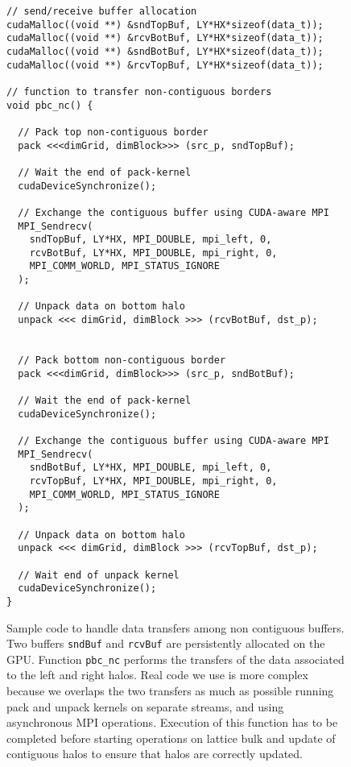 \documentclass{elsarticle}
\begin{document}
%
\begin{figure}
\centering
\begin{lstlisting}[basicstyle=\scriptsize]
// send/receive buffer allocation
cudaMalloc((void **) &sndTopBuf, LY*HX*sizeof(data_t));
cudaMalloc((void **) &rcvBotBuf, LY*HX*sizeof(data_t)); 
cudaMalloc((void **) &sndBotBuf, LY*HX*sizeof(data_t));
cudaMalloc((void **) &rcvTopBuf, LY*HX*sizeof(data_t)); 

// function to transfer non-contiguous borders
void pbc_nc() {

  // Pack top non-contiguous border
  pack <<<dimGrid, dimBlock>>> (src_p, sndTopBuf); 

  // Wait the end of pack-kernel
  cudaDeviceSynchronize();                      

  // Exchange the contiguous buffer using CUDA-aware MPI
  MPI_Sendrecv(
    sndTopBuf, LY*HX, MPI_DOUBLE, mpi_left, 0,
    rcvBotBuf, LY*HX, MPI_DOUBLE, mpi_right, 0,
    MPI_COMM_WORLD, MPI_STATUS_IGNORE
  );

  // Unpack data on bottom halo
  unpack <<< dimGrid, dimBlock >>> (rcvBotBuf, dst_p); 
  
  
  // Pack bottom non-contiguous border
  pack <<<dimGrid, dimBlock>>> (src_p, sndBotBuf); 

  // Wait the end of pack-kernel
  cudaDeviceSynchronize();                      

  // Exchange the contiguous buffer using CUDA-aware MPI
  MPI_Sendrecv(
    sndBotBuf, LY*HX, MPI_DOUBLE, mpi_left, 0,
    rcvTopBuf, LY*HX, MPI_DOUBLE, mpi_right, 0,
    MPI_COMM_WORLD, MPI_STATUS_IGNORE
  );

  // Unpack data on bottom halo
  unpack <<< dimGrid, dimBlock >>> (rcvTopBuf, dst_p); 
  
  // Wait end of unpack kernel
  cudaDeviceSynchronize();                          
}
\end{lstlisting}
\caption{\label{fig:nc-buffers}
Sample code to handle 
data transfers among non contiguous buffers. Two buffers {\tt sndBuf} and {\tt rcvBuf} 
are persistently allocated on the GPU. Function {\tt pbc\_nc} performs the 
transfers of the data associated to the left and right halos.
%
Real code we use is more complex because we overlaps the two transfers as 
much as possible running pack and unpack kernels on separate streams, and 
using asynchronous MPI operations. 
%
Execution of this function has to be completed before starting operations 
on lattice bulk and update of contiguous halos to ensure that halos are 
correctly updated.
}
\end{figure}
\end{document}
